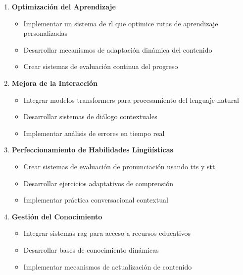 \begin{enumerate}
  \item \textbf{Optimización del Aprendizaje}
        \begin{itemize}
          \item Implementar un sistema de \gls{rl} que optimice rutas de aprendizaje personalizadas
          \item Desarrollar mecanismos de adaptación dinámica del contenido
          \item Crear sistemas de evaluación continua del progreso
        \end{itemize}

  \item \textbf{Mejora de la Interacción}
        \begin{itemize}
          \item Integrar modelos \gls{transformers} para procesamiento del lenguaje natural
          \item Desarrollar sistemas de diálogo contextuales
          \item Implementar análisis de errores en tiempo real
        \end{itemize}

  \item \textbf{Perfeccionamiento de Habilidades Lingüísticas}
        \begin{itemize}
          \item Crear sistemas de evaluación de pronunciación usando \gls{tts} y \gls{stt}
          \item Desarrollar ejercicios adaptativos de comprensión
          \item Implementar práctica conversacional contextual
        \end{itemize}

  \item \textbf{Gestión del Conocimiento}
        \begin{itemize}
          \item Integrar sistemas \gls{rag} para acceso a recursos educativos
          \item Desarrollar bases de conocimiento dinámicas
          \item Implementar mecanismos de actualización de contenido
        \end{itemize}
\end{enumerate}